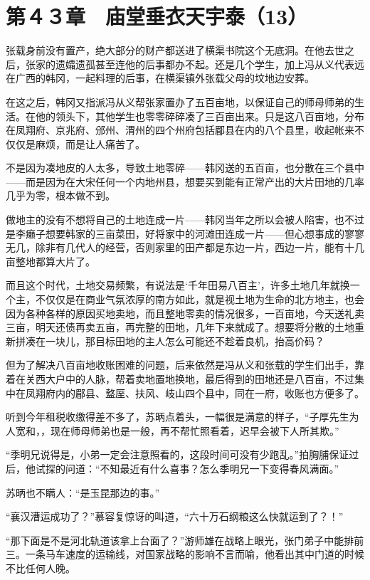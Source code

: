 \section{第４３章　庙堂垂衣天宇泰（13）}

张载身前没有置产，绝大部分的财产都送进了横渠书院这个无底洞。在他去世之后，张家的遗孀遗孤甚至连他的后事都办不起。还是几个学生，加上冯从义代表远在广西的韩冈，一起料理的后事，在横渠镇外张载父母的坟地边安葬。

在这之后，韩冈又指派冯从义帮张家置办了五百亩地，以保证自己的师母师弟的生活。在他的领头下，其他学生也零零碎碎凑了三百亩出来。只是这八百亩地，分布在凤翔府、京兆府、邠州、渭州的四个州府包括郿县在内的八个县里，收起帐来不仅仅是麻烦，而是让人痛苦了。

不是因为凑地皮的人太多，导致土地零碎——韩冈送的五百亩，也分散在三个县中——而是因为在大宋任何一个内地州县，想要买到能有正常产出的大片田地的几率几乎为零，根本做不到。

做地主的没有不想将自己的土地连成一片——韩冈当年之所以会被人陷害，也不过是李癞子想要韩家的三亩菜田，好将家中的河滩田连成一片——但心想事成的寥寥无几，除非有几代人的经营，否则家里的田产都是东边一片，西边一片，能有十几亩整地都算大片了。

而且这个时代，土地交易频繁，有说法是‘千年田易八百主’，许多土地几年就换一个主，不仅仅是在商业气氛浓厚的南方如此，就是视土地为生命的北方地主，也会因为各种各样的原因买地卖地，而且整地零卖的情况很多，一百亩地，今天送礼卖三亩，明天还债再卖五亩，再完整的田地，几年下来就成了。想要将分散的土地重新拼凑在一块儿，那目标田地的主人怎么可能还不趁着良机，抬高价码？

但为了解决八百亩地收账困难的问题，后来依然是冯从义和张载的学生们出手，靠着在关西大户中的人脉，帮着卖地置地换地，最后得到的田地还是八百亩，不过集中在凤翔府内的郿县、盩厔、扶风、岐山四个县中，同在一府，收账也方便多了。

听到今年租税收缴得差不多了，苏昞点着头，一幅很是满意的样子，“子厚先生为人宽和，，现在师母师弟也是一般，再不帮忙照看着，迟早会被下人所其欺。”

“季明兄说得是，小弟一定会注意照看的，这段时间可没有少跑乱。”拍胸脯保证过后，他试探的问道：“不知最近有什么喜事？怎么季明兄一下变得春风满面。”

苏昞也不瞒人：“是玉昆那边的事。”

“襄汉漕运成功了？”慕容复惊讶的叫道，“六十万石纲粮这么快就运到了？！”

“那下面是不是河北轨道该拿上台面了？”游师雄在战略上眼光，张门弟子中能排前三。一条马车速度的运输线，对国家战略的影响不言而喻，他看出其中门道的时候不比任何人晚。

